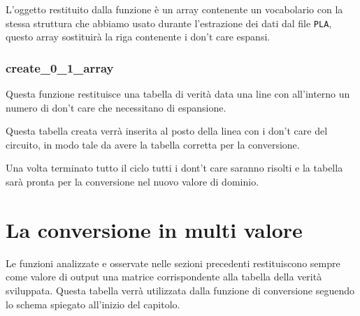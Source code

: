 \documentclass[italian,]{book}
\newenvironment{Shaded}{\begin{snugshade}}{\end{snugshade}}
\newcommand{\BuiltInTok}[1]{#1}
\newcommand{\ControlFlowTok}[1]{\textcolor[rgb]{0.13,0.29,0.53}{\textbf{#1}}}
\newcommand{\DecValTok}[1]{\textcolor[rgb]{0.00,0.00,0.81}{#1}}
\newcommand{\KeywordTok}[1]{\textcolor[rgb]{0.13,0.29,0.53}{\textbf{#1}}}
\newcommand{\NormalTok}[1]{#1}
\newcommand{\OperatorTok}[1]{\textcolor[rgb]{0.81,0.36,0.00}{\textbf{#1}}}
\begin{document}
L'oggetto restituito dalla funzione è un array contenente un vocabolario con la stessa struttura che abbiamo usato durante l'estrazione dei dati dal file \texttt{PLA}, questo array sostituirà la riga contenente i don't care espansi.

\hypertarget{create_0_1_array}{%
\subsubsection{create\_0\_1\_array}\label{create_0_1_array}}

\begin{Shaded}
\end{Shaded}

Questa funzione restituisce una tabella di verità data una line con all'interno un numero di don't care che necessitano di espansione.

Questa tabella creata verrà inserita al posto della linea con i don't care del circuito, in modo tale da avere la tabella corretta per la conversione.

Una volta terminato tutto il ciclo tutti i dont't care saranno risolti e la tabella sarà pronta per la conversione nel nuovo valore di dominio.

\newpage

\hypertarget{la-conversione-in-multi-valore}{%
\section{La conversione in multi valore}\label{la-conversione-in-multi-valore}}

Le funzioni analizzate e osservate nelle sezioni precedenti restituiscono sempre come valore di output una matrice corrispondente alla tabella della verità sviluppata. Questa tabella verrà utilizzata dalla funzione di conversione seguendo lo schema spiegato all'inizio del capitolo.
\end{document}
